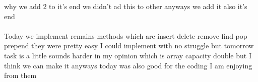 why we add 2 to it's end we didn't ad this to other anyways we add it also it's end \\\\
Today we implement remains methods which are insert delete remove find pop prepend they were
pretty easy I could implement with no struggle but tomorrow task is a little sounds harder
in my opinion which is array capacity double but I think we can make it anyways today was also
good for the coding I am enjoying from them 
